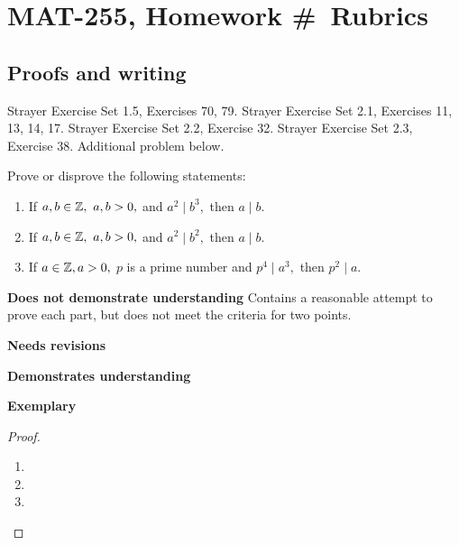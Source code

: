 \documentclass[letterpaper, 11pt]{../ximera}
\begin{document}
\chapter{MAT-255, Homework \#\homework\ Rubrics}

\section*{Proofs and writing}  %
Strayer Exercise Set 1.5, Exercises 70, 79.
Strayer Exercise Set 2.1, Exercises 11, 13, 14, 17.
Strayer Exercise Set 2.2, Exercise 32.
Strayer Exercise Set 2.3, Exercise 38.
Additional problem below.
\begin{ex} 
Prove or disprove the following statements:
  	\begin{enumerate}[label=(\alph*)] 
		\item If $a,b\in\mathbb Z,\ a,b>0,$ and $a^2\mid b^3,$ then $a\mid b$. 

		\item If $a,b\in\mathbb Z,\ a,b>0,$ and $a^2\mid b^2,$ then $a\mid b$. 
		
		\item If $a\in\mathbb Z, a>0,$ $p$ is a prime number and $p^4\mid a^3,$ then $p^2\mid a.$
	
	\end{enumerate}
 \end{ex}

\begin{writeRubric}
    \item \textbf{Does not demonstrate understanding}
     Contains a reasonable attempt to prove each part, but does not meet the criteria for two points.
    \item \textbf{Needs revisions}
     
    \item \textbf{Demonstrates understanding}
    
    \item \textbf{Exemplary}
        
\end{writeRubric}
                                       \begin{proof}
  	\begin{enumerate}[label=(\alph*)] 
		\item %

		\item %
		
		\item %


	\end{enumerate}
\end{proof}
\end{document}
